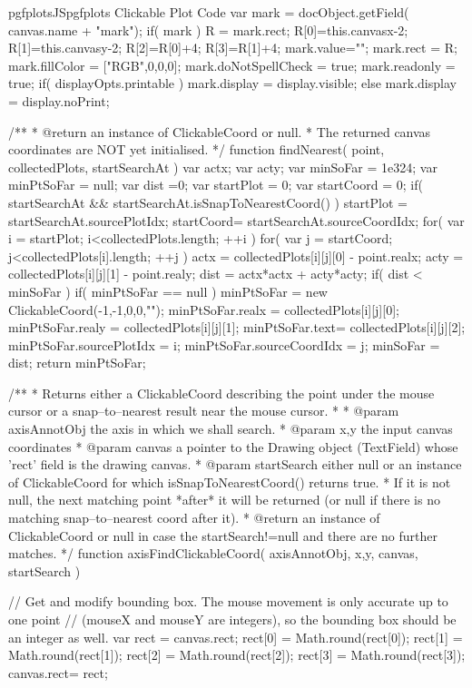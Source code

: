 {{\begin{insDLJS}[processAnnotatedPlot]{pgfplotsJS}{pgfplots Clickable Plot Code}
{{		var mark = docObject.getField( canvas.name + "mark");
		if( mark ) {
			R = mark.rect;
			R[0]=this.canvasx-2;
			R[1]=this.canvasy-2;
			R[2]=R[0]+4;
			R[3]=R[1]+4;
			mark.value="";
			mark.rect = R;
			mark.fillColor = ["RGB",0,0,0];
			mark.doNotSpellCheck = true;
			mark.readonly = true;
			if( displayOpts.printable )
				mark.display = display.visible;
			else
				mark.display = display.noPrint;
		}
	}
}

/**
 * @return an instance of ClickableCoord or null.
 * The returned canvas coordinates are NOT yet initialised.
 */
function findNearest( point, collectedPlots, startSearchAt )
{
	var actx;
	var acty;
	var minSoFar = 1e324;
	var minPtSoFar = null;
	var dist =0;
	var startPlot = 0;
	var startCoord = 0;
	if( startSearchAt && startSearchAt.isSnapToNearestCoord() ) {
		startPlot = startSearchAt.sourcePlotIdx;
		startCoord= startSearchAt.sourceCoordIdx;
	}
	for( var i = startPlot; i<collectedPlots.length; ++i ) {
		for( var j = startCoord; j<collectedPlots[i].length; ++j ) {
			actx = collectedPlots[i][j][0] - point.realx;
			acty = collectedPlots[i][j][1] - point.realy;
			dist = actx*actx + acty*acty;
			if( dist < minSoFar ) {
			 	if( minPtSoFar == null )
					minPtSoFar = new ClickableCoord(-1,-1,0,0,"");
				minPtSoFar.realx = collectedPlots[i][j][0];
				minPtSoFar.realy = collectedPlots[i][j][1];
				minPtSoFar.text= collectedPlots[i][j][2];
				minPtSoFar.sourcePlotIdx = i;
				minPtSoFar.sourceCoordIdx = j;
				minSoFar = dist;
			}
		}
	}
	return minPtSoFar;
}

/**
 * Returns either a ClickableCoord describing the point under the mouse cursor or a snap--to--nearest result near the mouse cursor.
 *
 * @param axisAnnotObj the axis in which we shall search.
 * @param x,y the input canvas coordinates
 * @param canvas a pointer to the Drawing object (TextField) whose 'rect' field is the drawing canvas.
 * @param startSearch either null or an instance of ClickableCoord for which isSnapToNearestCoord() returns true. 
 *   If it is not null, the next matching point *after* it will be returned (or null if there is no matching snap--to--nearest coord after it).
 * @return an instance of ClickableCoord or null in case the startSearch!=null and there are no further matches.
 */
function axisFindClickableCoord( axisAnnotObj, x,y, canvas, startSearch )
{
	// Get and modify bounding box. The mouse movement is only accurate up to one point 
	// (mouseX and mouseY are integers), so the bounding box should be an integer as well.
	var rect = canvas.rect;
	rect[0] = Math.round(rect[0]);
	rect[1] = Math.round(rect[1]);
	rect[2] = Math.round(rect[2]);
	rect[3] = Math.round(rect[3]);
	canvas.rect= rect;

}
\end{insDLJS}}}
